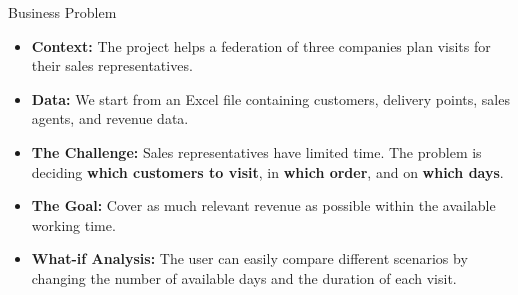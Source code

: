 \begin{frame}{Business Problem}
\begin{itemize}
    \item \textbf{Context:} The project helps a federation of three companies plan visits for their sales representatives.
    \item \textbf{Data:} We start from an Excel file containing customers, delivery points, sales agents, and revenue data.
    \item \textbf{The Challenge:} Sales representatives have limited time. The problem is deciding \textbf{which customers to visit}, in \textbf{which order}, and on \textbf{which days}.
    \item \textbf{The Goal:} Cover as much relevant revenue as possible within the available working time.
    \item \textbf{What-if Analysis:} The user can easily compare different scenarios by changing the number of available days and the duration of each visit.
\end{itemize}
\end{frame}
